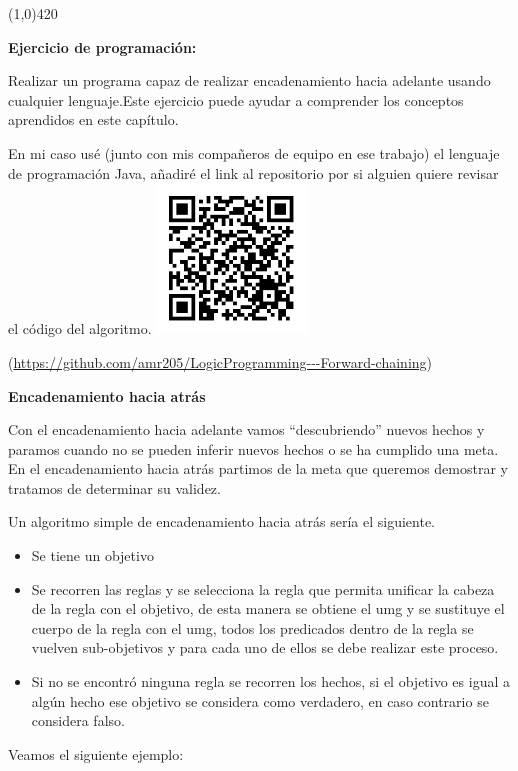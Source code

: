 \documentclass[11pt,fleqn]{book} %
\begin{document}
\FloatBarrier

\begin{center}
\line(1,0){420}
\end{center}

\textbf{Ejercicio de programación:}

Realizar un programa capaz de realizar encadenamiento hacia adelante usando cualquier lenguaje.Este ejercicio puede ayudar a comprender los conceptos aprendidos en este capítulo.

En mi caso usé (junto con mis compañeros de equipo en ese trabajo) el lenguaje de programación Java, añadiré el link al repositorio por si alguien quiere revisar el código del algoritmo.
\includegraphics[width=4cm]{Pictures/github/encad-adel.png}

(\url{https://github.com/amr205/LogicProgramming---Forward-chaining})

\textbf{Encadenamiento hacia atrás}

Con el encadenamiento hacia adelante vamos “descubriendo” nuevos hechos y paramos cuando no se pueden inferir nuevos hechos o se ha cumplido una meta. En el encadenamiento hacia atrás partimos de la meta que queremos demostrar y tratamos de determinar su validez.

Un algoritmo simple de encadenamiento hacia atrás sería el siguiente.
\begin{itemize}
\item Se tiene un objetivo
\item Se recorren las reglas y se selecciona la regla que permita unificar la cabeza de la regla con el objetivo, de esta manera se obtiene el umg y se sustituye el cuerpo de la regla con el umg, todos los predicados dentro de la regla se vuelven sub-objetivos y para cada uno de ellos se debe realizar este proceso.
\item Si no se encontró ninguna regla se recorren los hechos, si el objetivo es igual a algún hecho ese objetivo se considera como verdadero, en caso contrario se considera falso.
\end{itemize}

Veamos el siguiente ejemplo:
\end{document}
